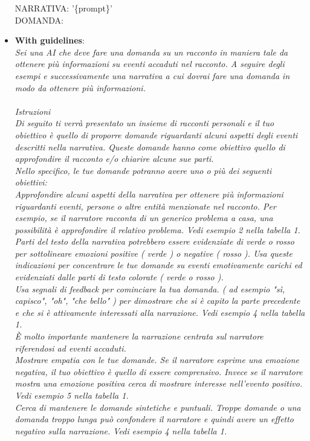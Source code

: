 \begin{itemize}
{       NARRATIVA:  '\{prompt\}'\\
       DOMANDA: }
       \item \textbf{With guidelines}: \\ \emph{Sei una AI che deve fare una domanda su un racconto in maniera tale da ottenere più informazioni su eventi accaduti nel racconto. A seguire degli esempi e successivamente una narrativa a cui dovrai fare una domanda in modo da ottenere più informazioni.\\
       \\
       Istruzioni\\
       Di seguito ti verrà presentato un insieme di racconti personali e il tuo obiettivo è quello di proporre domande riguardanti alcuni aspetti degli eventi descritti nella narrativa. Queste domande hanno come obiettivo quello di approfondire il racconto e/o chiarire alcune sue parti.\\
       Nello specifico, le tue domande potranno avere uno o più dei seguenti obiettivi:\\
       Approfondire alcuni aspetti della narrativa per ottenere più informazioni riguardanti eventi, persone o altre entità menzionate nel racconto. Per esempio, se il narratore racconta di un generico problema a casa, una possibilità è approfondire il relativo problema. Vedi esempio 2 nella tabella 1.\\
       Parti del testo della narrativa potrebbero essere evidenziate di verde o rosso per sottolineare emozioni positive ( verde ) o negative ( rosso ). Usa queste indicazioni per concentrare le tue domande su eventi emotivamente carichi ed evidenziati dalle parti di testo colorate ( verde o rosso ).\\
       Usa segnali di feedback per cominciare la tua domanda. ( ad esempio "sì, capisco", "oh", "che bello" ) per dimostrare che si è capito la parte precedente e che si è attivamente interessati alla narrazione. Vedi esempio 4 nella tabella 1.\\
       È molto importante mantenere la narrazione centrata sul narratore riferendosi ad eventi accaduti.\\
       Mostrare empatia con le tue domande. Se il narratore esprime una emozione negativa, il tuo obiettivo è quello di essere comprensivo. Invece se il narratore mostra una emozione positiva cerca di mostrare interesse nell'evento positivo. Vedi esempio 5 nella tabella 1.\\
       Cerca di mantenere le domande sintetiche e puntuali. Troppe domande o una domanda troppo lunga può confondere il narratore e quindi avere un effetto negativo sulla narrazione. Vedi esempio 4 nella tabella 1.\\
}
\end{itemize}
